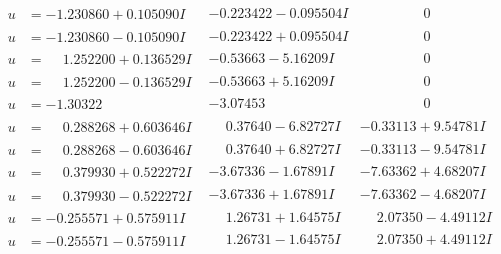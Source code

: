 \documentclass[1p]{elsarticle_modified}
\theoremstyle{definition}
\begin{document}
$$\begin{array}{c|c|c}
\begin{aligned}
u &= -1.230860 + 0.105090 I\end{aligned}
 & -0.223422 - 0.095504 I & \phantom{-0.000000 } 0 \\ \hline\begin{aligned}
u &= -1.230860 - 0.105090 I\end{aligned}
 & -0.223422 + 0.095504 I & \phantom{-0.000000 } 0 \\ \hline\begin{aligned}
u &= \phantom{-}1.252200 + 0.136529 I\end{aligned}
 & -0.53663 - 5.16209 I & \phantom{-0.000000 } 0 \\ \hline\begin{aligned}
u &= \phantom{-}1.252200 - 0.136529 I\end{aligned}
 & -0.53663 + 5.16209 I & \phantom{-0.000000 } 0 \\ \hline\begin{aligned}
u &= -1.30322\phantom{ +0.000000I}\end{aligned}
 & -3.07453\phantom{ +0.000000I} & \phantom{-0.000000 } 0 \\ \hline\begin{aligned}
u &= \phantom{-}0.288268 + 0.603646 I\end{aligned}
 & \phantom{-}0.37640 - 6.82727 I & -0.33113 + 9.54781 I \\ \hline\begin{aligned}
u &= \phantom{-}0.288268 - 0.603646 I\end{aligned}
 & \phantom{-}0.37640 + 6.82727 I & -0.33113 - 9.54781 I \\ \hline\begin{aligned}
u &= \phantom{-}0.379930 + 0.522272 I\end{aligned}
 & -3.67336 - 1.67891 I & -7.63362 + 4.68207 I \\ \hline\begin{aligned}
u &= \phantom{-}0.379930 - 0.522272 I\end{aligned}
 & -3.67336 + 1.67891 I & -7.63362 - 4.68207 I \\ \hline\begin{aligned}
u &= -0.255571 + 0.575911 I\end{aligned}
 & \phantom{-}1.26731 + 1.64575 I & \phantom{-}2.07350 - 4.49112 I \\ \hline\begin{aligned}
u &= -0.255571 - 0.575911 I\end{aligned}
 & \phantom{-}1.26731 - 1.64575 I & \phantom{-}2.07350 + 4.49112 I \\ \hline\begin{aligned}

\end{aligned}
\end{array}$$
\end{document}
